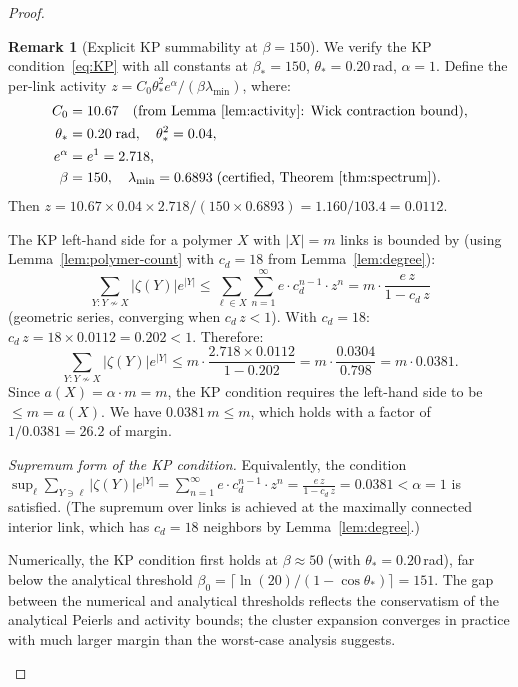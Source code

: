 \documentclass[11pt]{article}
\theoremstyle{definition}
\newtheorem{remark}[theorem]{Remark}
\begin{document}
\begin{proof}
\begin{remark}[Explicit KP summability at $\beta=150$]%
\label{rem:KP-explicit}
We verify the KP condition~\eqref{eq:KP} with all constants
at $\beta_*=150$, $\theta_*=0.20$\,rad, $\alpha=1$.
Define the per-link activity
$z=C_0\theta_*^2 e^\alpha/(\beta\lambda_{\min})$, where:
\begin{align*}
C_0&=10.67\quad\text{(from Lemma~\ref{lem:activity}: Wick
contraction bound)},\\
\theta_*&=0.20\;\text{rad},\quad\theta_*^2=0.04,\\
e^\alpha&=e^1=2.718,\\
\beta&=150,\quad\lambda_{\min}=0.6893\;\text{(certified,
Theorem~\ref{thm:spectrum})}.
\end{align*}
Then $z=10.67\times 0.04\times 2.718/(150\times 0.6893)
=1.160/103.4=0.0112$.

The KP left-hand side for a polymer $X$ with $|X|=m$ links
is bounded by (using Lemma~\ref{lem:polymer-count} with
$c_d=18$ from Lemma~\ref{lem:degree}):
\begin{equation}\label{eq:KP-explicit}
\sum_{Y:Y\not\sim X}|\zeta(Y)|e^{|Y|}
\le\sum_{\ell\in X}\sum_{n=1}^\infty e\cdot c_d^{n-1}\cdot z^n
=m\cdot\frac{e\,z}{1-c_d\,z}
\end{equation}
(geometric series, converging when $c_d\,z<1$).
With $c_d=18$: $c_d\,z=18\times 0.0112=0.202<1$.
Therefore:
\[
\sum_{Y:Y\not\sim X}|\zeta(Y)|e^{|Y|}
\le m\cdot\frac{2.718\times 0.0112}{1-0.202}
=m\cdot\frac{0.0304}{0.798}
=m\cdot 0.0381.
\]
Since $a(X)=\alpha\cdot m=m$, the KP condition requires the
left-hand side to be $\le m=a(X)$.  We have $0.0381\,m\le m$,
which holds with a factor of $1/0.0381=26.2$ of margin.

\emph{Supremum form of the KP condition.}
Equivalently, the condition
$\sup_\ell\sum_{Y\ni\ell}|\zeta(Y)|e^{|Y|}
=\sum_{n=1}^\infty e\cdot c_d^{n-1}\cdot z^n
=\frac{e\,z}{1-c_d\,z}=0.0381<\alpha=1$
is satisfied.  (The supremum over links is achieved at
the maximally connected interior link, which has
$c_d=18$ neighbors by Lemma~\ref{lem:degree}.)

Numerically, the KP condition first holds at $\beta\approx 50$
(with $\theta_*=0.20$\,rad), far below the analytical threshold
$\beta_0=\lceil\ln(20)/(1-\cos\theta_*)\rceil=151$.
The gap between the numerical and analytical thresholds reflects
the conservatism of the analytical Peierls and activity bounds;
the cluster expansion converges in practice with much larger
margin than the worst-case analysis suggests.
\end{remark}


\end{proof}
\end{document}
